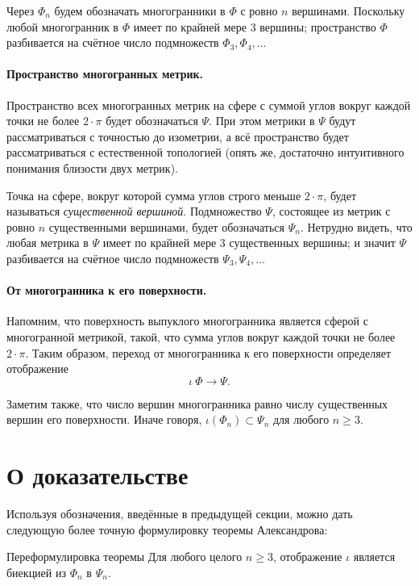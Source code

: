 \documentclass[oneside,a4paper]{article}
\begin{document}
Через $\Phi_n$ будем обозначать многогранники в $\Phi$ с ровно $n$ вершинами.
Поскольку любой многогранник в $\Phi$ имеет по крайней мере 3 вершины;
пространство $\Phi$ разбивается на счётное число подмножеств $\Phi_3,\Phi_4,\dots$

\paragraph{Пространство многогранных метрик.}
Пространство всех многогранных метрик на сфере с суммой углов вокруг каждой точки не более $2\cdot\pi$ будет обозначаться $\Psi$.
При этом метрики в $\Psi$ будут рассматриваться с точностью до изометрии, а всё пространство будет рассматриваться с естественной топологией (опять же, достаточно интуитивного понимания близости двух метрик).

Точка на сфере, вокруг которой сумма углов строго меньше $2\cdot\pi$, будет называться \emph{существенной вершиной}.
Подмножество $\Psi$, состоящее из метрик с ровно $n$ существенными вершинами, будет обозначаться $\Psi_n$.
Нетрудно видеть, что любая метрика в $\Psi$ имеет по крайней мере 3 существенных вершины;
и значит $\Psi$ разбивается на счётное число подмножеств $\Psi_3,\Psi_4,\dots$

\paragraph{От многогранника к его поверхности.}
Напомним, что поверхность выпуклого многогранника является сферой с многогранной метрикой, такой, что сумма углов вокруг каждой точки не более $2\cdot\pi$.
Таким образом, переход от многогранника к его поверхности определяет отображение 
\[\iota\:\Phi\to \Psi.\]

Заметим также, что число вершин многогранника равно числу существенных вершин его поверхности.
Иначе говоря, $\iota(\Phi_n)\subset \Psi_n$ для любого $n\ge 3$.

\section{О доказательстве}

Используя обозначения, введённые в предыдущей секции, можно дать следующую более точную формулировку теоремы Александрова:

\begin{thm}{Переформулировка теоремы}
Для любого целого $n\ge 3$,
отображение $\iota$ является биекцией из $\Phi_n$ в $\Psi_n$.
\end{thm}
\end{document}
